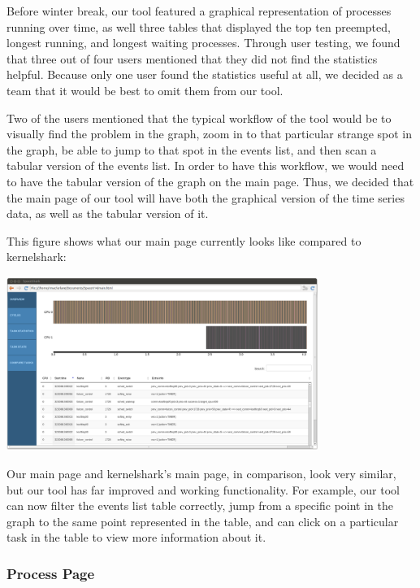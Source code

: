 \documentclass{hmcclinic}
\begin{document}
Before winter break, our tool featured a graphical representation of processes running over time, as well three tables that displayed the top ten preempted, longest running, and longest waiting processes. Through user testing, we found that three out of four users mentioned that they did not find the statistics helpful. Because only one user found the statistics useful at all, we decided as a team that it would be best to omit them from our tool.

Two of the users mentioned that the typical workflow of the tool would be to visually find the problem in the graph, zoom in to that particular strange spot in the graph, be able to jump to that spot in the events list, and then scan a tabular version of the events list. In order to have this workflow, we would need to have the tabular version of the graph on the main page. Thus, we decided that the main page of our tool will have both the graphical version of the time series data, as well as the tabular version of it.

This figure shows what our main page currently looks like compared to kernelshark:
\begin{center}
\includegraphics[width=4in]{overview-page.png}
\end{center}

Our main page and kernelshark's main page, in comparison, look very similar, but our tool has far improved and working functionality. For example, our tool can now filter the events list table correctly, jump from a specific point in the graph to the same point represented in the table, and can click on a particular task in the table to view more information about it.

\subsubsection{Process Page}
\end{document}
